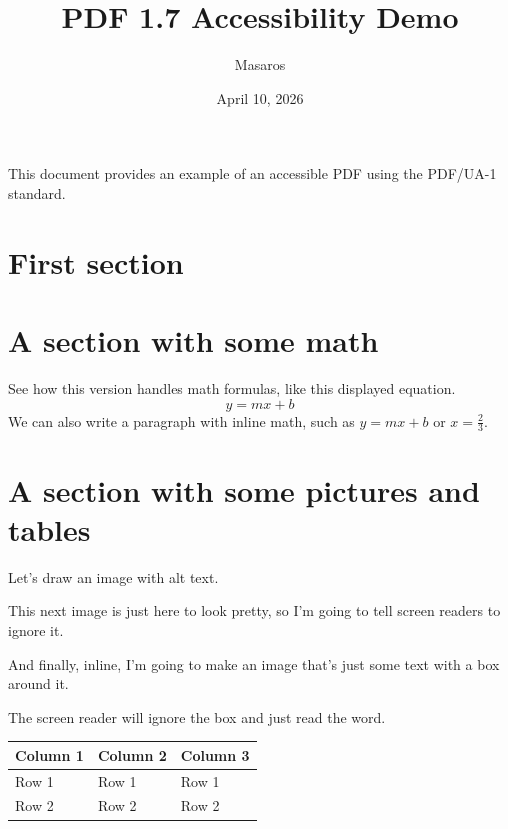 \documentclass[10pt]{article}
\title{PDF 1.7 Accessibility Demo}
\author{Masaros}
\date{April 10, 2026}
\begin{document}
\maketitle
This document provides an example of an accessible PDF using the PDF/UA-1 standard.
\section{First section}
\lipsum[1]
\section{A section with some math}
See how this version handles math formulas, like this displayed equation.
\[
y=mx+b
\]
We can also write a paragraph with inline math, such as $y=mx+b$ or $x=\frac{2}{3}$.
\section{A section with some pictures and tables}
Let's draw an image with alt text.
\begin{center}
\end{center}
This next image is just here to look pretty, so I'm going to tell screen readers to ignore it.
\begin{center}
\end{center}
And finally, inline, I'm going to make an image that's just some text with a box around it.
The screen reader will ignore the box and just read the word.
\begin{center}
\begin{tabular}{lll}
Column 1&Column 2&Column 3\\\hline
Row 1&Row 1&Row 1\\
Row 2&Row 2&Row 2
\end{tabular}
\end{center}
\end{document}
